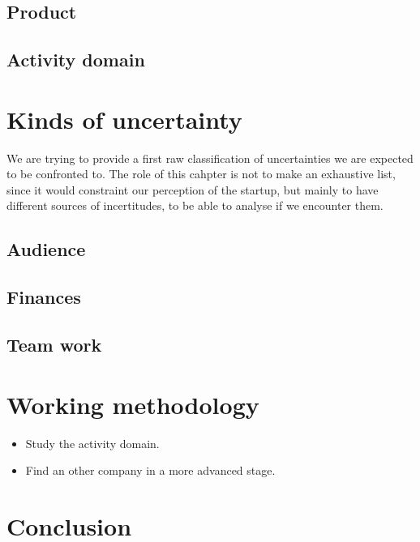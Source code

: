 \documentclass[twoside]{report}
\begin{document}
\section{Product}
\section{Activity domain}
\chapter{Kinds of uncertainty}
We are trying to provide a first raw classification of uncertainties we are expected to be confronted to. The role of this cahpter is not to make an exhaustive list, since it would constraint our perception of the startup, but mainly to have different sources of incertitudes, to be able to analyse if we encounter them.
\section{Audience}
\section{Finances}
\section{Team work}

\chapter{Working methodology}
\begin{itemize}
	\item Study the activity domain.
	\item Find an other company in a more advanced stage.
\end{itemize}
\chapter{Conclusion}
\appendix
\end{document}
